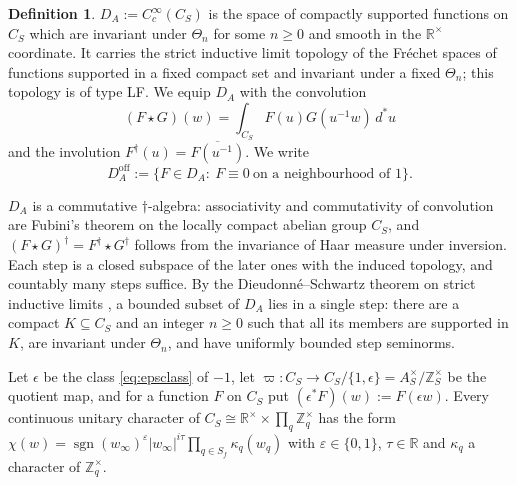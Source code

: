 \documentclass[11pt]{amsart}
\theoremstyle{definition}
\newtheorem{definition}[theorem]{Definition}
\theoremstyle{remark}
\newcommand{\R}{\mathbb R}
\newcommand{\Z}{\mathbb Z}
\newcommand{\dstar}{\,d^{*}}
\newcommand{\sgn}{\operatorname{sgn}}
\newcommand{\DA}{D_A}
\begin{document}
\begin{definition}\label{def:DA}
$\DA:=C_c^{\infty}(C_S)$ is the space of compactly supported functions on
$C_S$ which are invariant under $\Theta_n$ for some $n\ge0$ and smooth in
the $\R^{\times}$ coordinate.  It carries the
strict inductive limit topology of the Fr\'echet spaces of functions supported
in a fixed compact set and invariant under a fixed $\Theta_n$; this topology
is of type LF.  We equip $\DA$ with the convolution
\[
(F\star G)(w)=\int_{C_S}F(u)G(u^{-1}w)\dstar u
\]
and the involution $F^{\dagger}(u)=\overline{F(u^{-1})}$.  We write
\[
\DA^{\mathrm{off}}:=\{F\in\DA:\ F\equiv0\ \text{on a neighbourhood of }1\}.
\]
\end{definition}

$\DA$ is a commutative $\dagger$-algebra: associativity and commutativity of
convolution are Fubini's theorem on the locally compact abelian group $C_S$,
and $(F\star G)^{\dagger}=F^{\dagger}\star G^{\dagger}$ follows from the
invariance of Haar measure under inversion.  Each step is a closed subspace of
the later ones with the induced topology, and countably many steps suffice.
By the Dieudonn\'e--Schwartz theorem on strict inductive limits
\cite[Ch.~II, 6.5]{Schaefer}, a bounded subset of $\DA$ lies in a single step: there are a compact
$K\subseteq C_S$ and an integer $n\ge0$ such that all its members are supported
in $K$, are invariant under $\Theta_n$, and have uniformly bounded step
seminorms.

Let $\epsilon$ be the class \eqref{eq:epsclass} of $-1$, let
$\varpi:C_S\to C_S/\{1,\epsilon\}=A_S^{\times}/\Z_S^{\times}$ be the
quotient map, and for a function $F$ on $C_S$ put
$(\epsilon^{*}F)(w):=F(\epsilon w)$.  Every continuous unitary character of
$C_S\cong\R^{\times}\times\prod_q\Z_q^{\times}$ has the form
$\chi(w)=\sgn(w_{\infty})^{\varepsilon}|w_{\infty}|^{i\tau}
\prod_{q\in S_f}\kappa_q(w_q)$ with $\varepsilon\in\{0,1\}$, $\tau\in\R$ and
$\kappa_q$ a character of $\Z_q^{\times}$.
\end{document}

